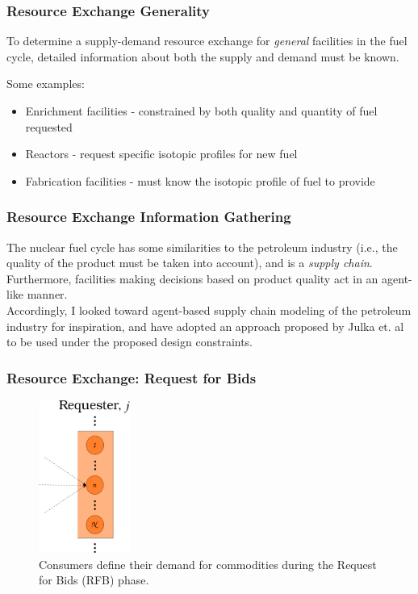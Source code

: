 
\begin{frame}[ctb!]
  \frametitle{Resource Exchange Generality}

  To determine a supply-demand resource exchange for \textit{general} facilities
  in the fuel cycle, detailed information about both the supply and demand must
  be known.

  Some examples:
  
  \begin{itemize}
    \item Enrichment facilities - constrained by both quality and quantity of fuel
      requested
    \item Reactors - request specific isotopic profiles for new fuel
    \item Fabrication facilities - must know the isotopic profile of fuel to
      provide
  \end{itemize}
  
\end{frame}

\begin{frame}[ctb!]
  \frametitle{Resource Exchange Information Gathering}

  The nuclear fuel cycle has some similarities to the petroleum industry (i.e.,
  the quality of the product must be taken into account), and is a
  \textit{supply chain}.\\

  Furthermore, facilities making decisions based on product quality act in an
  agent-like manner.\\ 

  Accordingly, I looked toward agent-based supply chain modeling of the
  petroleum industry for inspiration, and have adopted an approach proposed by
  Julka et. al \cite{julka_agent-based_2002} to be used under the proposed
  \Cyclus design constraints.
\end{frame}

\begin{frame}[ctb!]
  \frametitle{Resource Exchange: Request for Bids}
  \begin{figure}
    \includegraphics[height=5cm]{./images/requester.eps}
    \caption{Consumers define their demand for commodities during the Request
      for Bids (RFB) phase.}
  \end{figure}
\end{frame}

